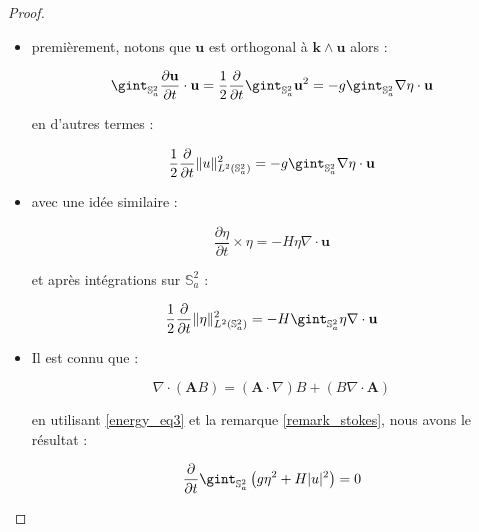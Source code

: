 \begin{proof}
\begin{itemize}
\item premièrement, notons que $\mathbf{u}$ est orthogonal à $\mathbf{k} \wedge \mathbf{u}$ alors :

$$\gint_{\mathbb{S}_a^2} \dfrac{\partial \mathbf{u}}{\partial t} \cdot \mathbf{u} = \dfrac{1}{2} \dfrac{\partial}{\partial t} \gint_{\mathbb{S}_a^2} \mathbf{u}^2 = -g \gint_{\mathbb{S}_a^2} \nabla \eta \cdot \mathbf{u}$$

en d'autres termes :

\begin{equation}
\dfrac{1}{2} \dfrac{\partial}{\partial t} \| u \|_{L^2(\mathbb{S}_a^2)}^2 = -g \gint_{\mathbb{S}_a^2} \nabla \eta \cdot \mathbf{u}
\label{energy_eq1}
\end{equation}

\item avec une idée similaire :

$$\dfrac{\partial \eta}{\partial t} \times \eta = -H \eta \nabla \cdot \mathbf{u} $$

et après intégrations sur $\mathbb{S}_a^2$ :

\begin{equation}
\dfrac{1}{2} \dfrac{\partial}{\partial t} \| \eta \|^2_{L^2(\mathbb{S}_a^2)} = -H \gint_{\mathbb{S}_a^2} \eta \nabla \cdot \mathbf{u}
\label{energy_eq2}
\end{equation}

\item Il est connu que :

\begin{equation}
\nabla \cdot \left( \mathbf{A} B \right) = \left( \mathbf{A} \cdot \nabla \right) B + \left( B \nabla \cdot \mathbf{A} \right)
\label{energy_eq3}
\end{equation}

en utilisant \eqref{energy_eq3} et la remarque \ref{remark_stokes}, nous avons le résultat :

\begin{equation}
\dfrac{\partial}{\partial t} \gint_{\mathbb{S}^2_a} \left( g  \eta^2 + H | u |^2 \right) = 0
\end{equation}
\end{itemize}
\end{proof}















